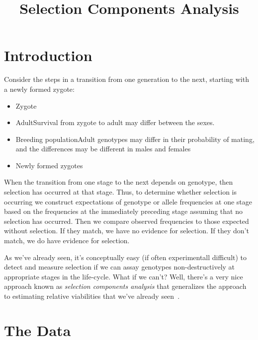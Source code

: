 \documentclass[12pt]{article}
\title{Selection Components Analysis}
\begin{document}
\maketitle

\thispagestyle{first}

\section*{Introduction}

Consider the steps in a transition from one generation to the next,
starting with a newly formed zygote:

\begin{itemize}

\item Zygote

\item Adult{\dash}Survival from zygote to adult may differ between the
sexes.

\item Breeding population{\dash}Adult genotypes may differ in their
probability of mating, and the differences may be different in males
and females

\item Newly formed zygotes

\end{itemize}

\noindent When the transition from one stage to the next depends on
genotype, then selection has occurred at that stage. Thus, to
determine whether selection is occurring we construct expectations of
genotype or allele frequencies at one stage based on the frequencies
at the immediately preceding stage assuming that no selection has
occurred. Then we compare observed frequencies to those expected
without selection. If they match, we have no evidence for
selection. If they don't match, we do have evidence for selection. 

As we've already seen, it's conceptually easy (if often experimentall
difficult) to detect and measure selection if we can assay genotypes
non-destructively at appropriate stages in the life-cycle. What if we
can't? Well, there's a very nice approach known as {\it selection
  components analysis\/} that generalizes the approach to estimating
relative viabilities that we've already
seen~\cite{Christiansen-Frydenberg-1973}.

\section*{The Data}
\end{document}
